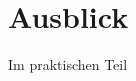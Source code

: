 \documentclass[11pt,a4paper]{report} %
\begin{document}
%



\chapter{Ausblick}
\label{ch:ausblick}
Im praktischen Teil

\printbibliography%
\listoffigures
\listoftables
\lstlistoflistings
\appendix


\end{document}
